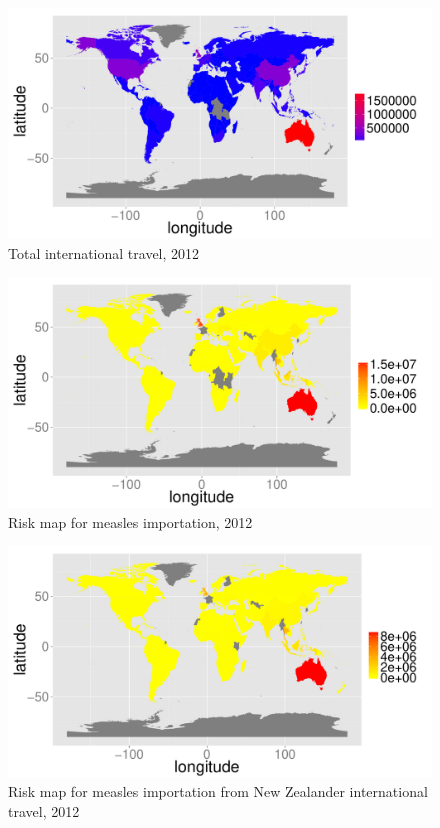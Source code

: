 \documentclass{article}
\begin{document}
\begin{figure}
\begin{center}
\includegraphics{draftfinalreport-041}
\end{center}
\caption{Total international travel, 2012 }
\label{fig:travel12}
\end{figure}

\begin{figure}
\begin{center}
\includegraphics{draftfinalreport-042}
\end{center}
\caption{Risk map for measles importation, 2012 }
\label{fig:risk12}
\end{figure}

\begin{figure}
\begin{center}
\includegraphics{draftfinalreport-043}
\end{center}
\caption{Risk map for measles importation from New Zealander international travel, 2012 }
\label{fig:nzrisk12}
\end{figure}
\end{document}
